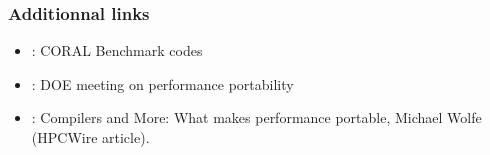 \begin{frame}
  \frametitle{Additionnal links}

  \begin{itemize}
  \item {} : CORAL Benchmark codes
  \item {} : DOE meeting on performance portability
  \item {} : Compilers and More: What makes performance portable, Michael Wolfe (HPCWire article).
  \end{itemize}

\end{frame}
